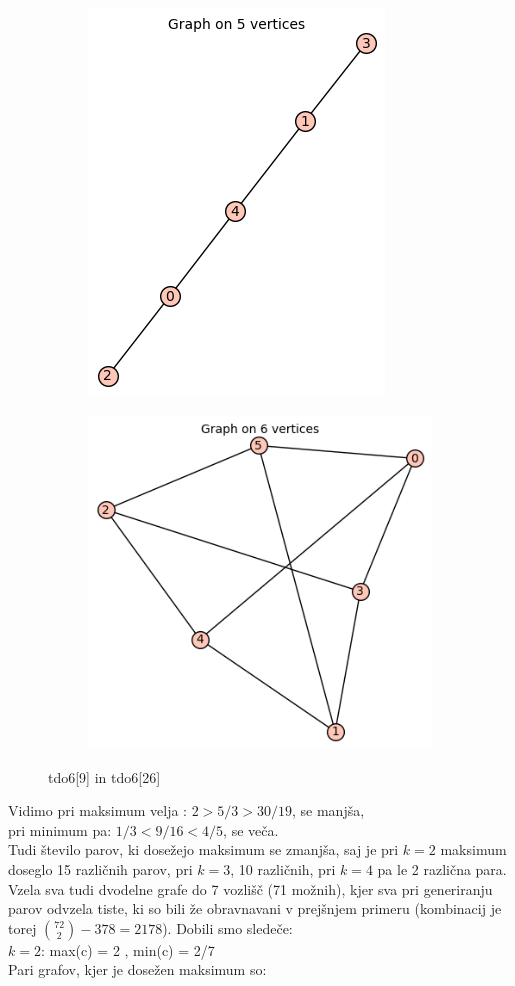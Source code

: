 \documentclass[12pt, a4paper]{article}
\begin{document}
\begin{center}
\begin{figure}[!htb]
\centering
\begin{subfigure}{0.5\textwidth}
  \centering
  \includegraphics[width=0.5\linewidth]{tdo6[9]}
\end{subfigure}%
\begin{subfigure}{0.5\textwidth}
  \centering
  \includegraphics[width=0.5\linewidth]{tdo6[26]}
\end{subfigure}
\caption{tdo6[9] in tdo6[26]}
\label{fig:test}
\end{figure}

\end{center}
Vidimo pri maksimum velja : $2>5/3>30/19$, se manjša, \\
pri minimum pa: $1/3<9/16<4/5$, se veča. \\
Tudi število parov, ki dosežejo maksimum se zmanjša, saj je pri $k=2$ maksimum doseglo 15 različnih parov, pri $k=3$, 10 različnih, pri $k=4$ pa le 2 različna para. \\ \newpage
Vzela sva tudi dvodelne grafe do 7 vozlišč (71 možnih), kjer sva pri generiranju parov odvzela tiste, ki so bili že obravnavani v prejšnjem primeru (kombinacij je torej $\binom{72}{2} - 378=2178$). Dobili smo sledeče: \\
$k=2$:  max(c) = 2 , min(c) = 2/7 \\
Pari grafov, kjer je dosežen maksimum so:
\end{document}

